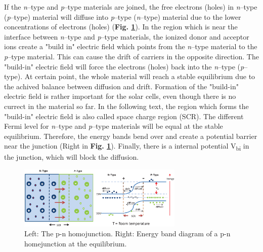 \documentclass[a4paper, 12pt, titlepage,oneside,drop]{kthesis}
\begin{document}
If the \textit{n}--type and \textit{p}--type materials are joined, the free electrons (holes) in \textit{n}--type (\textit{p}--type) material will diffuse into \textit{p}--type (\textit{n}--type) material due to the
lower concentrations of electrons (holes) (\textbf{Fig. \ref{pnjunction}}). In the region which is near the interface between \textit{n}--type and \textit{p}--type materials, the ionized donor and acceptor ions create a
"build in" electric field which points from the \textit{n}--type material to the \textit{p}--type material. This can cause the drift of carriers in the opposite direction. The "build-in" electric field will force the electrons (holes) back into the \textit{n}--type (\textit{p}--type). At certain point, 
the whole material will reach a stable equilibrium due to the achived balance between diffusion and drift. Formation of the "build-in" electric field is rather important for the solar cells, even though there is no currect in 
the material so far. In the following text, the region which forms the "build-in" electric field is also called space charge region (SCR). The different Fermi level for \textit{n}--type and \textit{p}--type materials will
be equal at the stable equilibrium. Therefore, the energy bands bend over and create a potential barrier near the junction (Right in \textbf{Fig. \ref{pnjunction}}). Finally, there is a internal potential V\textsubscript{bi}
in the junction, which will block the diffusion.





\begin{figure}[H]
    \begin{center}
            \includegraphics[width=0.7\textwidth]{pnjunction.eps}
     \end{center}
    \caption{Left: The p-n homojunction. Right: Energy band diagram of a p-n homejunction at the equilibrium. }      
    \label{pnjunction}
\end{figure}
\end{document}
